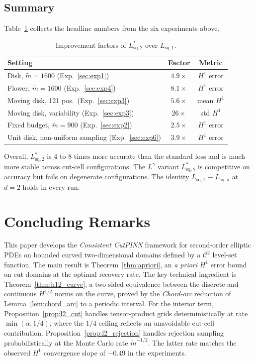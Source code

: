 \documentclass[11pt]{article}
\newcommand{\C}{\mathcal{C}}
\newcommand{\mtil}{\widetilde{m}}
\begin{document}
\subsection{Summary}
\label{sec:exp_summary}
Table~\ref{tab:summary} collects the headline numbers from the six
experiments above.
\begin{table}[htb!]
  \centering
  \caption{Improvement factors of $L^*_{\mathrm{sq},2}$ over
    $L_{\mathrm{sq},1}$.}
  \label{tab:summary}
  \begin{tabular}{lcc}
    \toprule
    Setting & Factor & Metric \\
    \midrule
    Disk, $\mtil=1600$ (Exp.~\ref{sec:exp1})
      & $4.9\times$ & $H^1$ error \\
    Flower, $\mtil=1600$ (Exp.~\ref{sec:exp4})
      & $8.1\times$ & $H^1$ error \\
    Moving disk, 121 pos.\ (Exp.~\ref{sec:exp3})
      & $5.6\times$ & mean $H^1$ \\
    Moving disk, variability (Exp.~\ref{sec:exp3})
      & $26\times$  & std $H^1$ \\
    Fixed budget, $\mtil=900$ (Exp.~\ref{sec:exp2})
      & $2.5\times$ & $H^1$ error \\
    Unit disk, non-uniform sampling (Exp.~\ref{sec:exp6})
      & $3.9\times$ & $H^1$ error \\
    \bottomrule
  \end{tabular}
\end{table}

Overall, $L^*_{\mathrm{sq},2}$ is $4$ to $8$ times more accurate
than the standard loss and is much more stable across cut-cell
configurations. The $L^\gamma$ variant $L^*_{\mathrm{sq},\gamma}$
is competitive on accuracy but fails on degenerate configurations.
The identity $L_{\mathrm{sq},1} \equiv L_{\mathrm{sq},\lambda}$ at
$d=2$ holds in every run.
\section{Concluding Remarks}
\label{sec:conclusion}

This paper develops the \emph{Consistent CutPINN} framework for
second-order elliptic PDEs on bounded curved two-dimensional
domains defined by a $\C^2$ level-set function. The main result is
Theorem~\ref{thm:apriori}, an \emph{a priori} $H^1$ error bound on
cut domains at the optimal recovery rate. The key technical
ingredient is Theorem~\ref{thm:h12_curve}, a two-sided equivalence
between the discrete and continuous $H^{1/2}$ norms on the curve,
proved by the \textit{Chord-arc} reduction of Lemma~\ref{lem:chord_arc} to
a periodic interval. For the interior term,
Proposition~\ref{prop:l2_cut} handles tensor-product grids
deterministically at rate $\min(\alpha, 1/4)$, where the $1/4$
ceiling reflects an unavoidable cut-cell contribution.
Proposition~\ref{prop:l2_rejection} handles rejection sampling
probabilistically at the Monte Carlo rate $\tilde{m}^{-1/2}$. The
latter rate matches the observed $H^1$ convergence slope of
$-0.49$ in the experiments.
\end{document}

